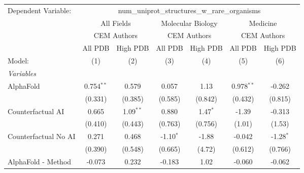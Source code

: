\begingroup
\centering
\begin{tabular}{lcccccc}
   \tabularnewline \midrule \midrule
   Dependent Variable: & \multicolumn{6}{c}{num\_uniprot\_structures\_w\_rare\_organisms}\\
 & \multicolumn{2}{c}{All Fields} & \multicolumn{2}{c}{Molecular Biology} & \multicolumn{2}{c}{Medicine} \\
\cmidrule(lr){2-3} \cmidrule(lr){4-5} \cmidrule(lr){6-7}
 & \multicolumn{2}{c}{CEM Authors} & \multicolumn{2}{c}{CEM Authors} & \multicolumn{2}{c}{CEM Authors} \\
\cmidrule(lr){2-3} \cmidrule(lr){4-5} \cmidrule(lr){6-7}
 & \multicolumn{1}{c}{All PDB} & \multicolumn{1}{c}{High PDB} & \multicolumn{1}{c}{All PDB} & \multicolumn{1}{c}{High PDB} & \multicolumn{1}{c}{All PDB} & \multicolumn{1}{c}{High PDB} \\
\cmidrule(lr){2-2} \cmidrule(lr){3-3} \cmidrule(lr){4-4} \cmidrule(lr){5-5} \cmidrule(lr){6-6} \cmidrule(lr){7-7}
   Model:                                                     & (1)          & (2)           & (3)           & (4)           & (5)          & (6)\\  
   \midrule
   \emph{Variables}\\
   AlphaFold                                                  & 0.754$^{**}$ & 0.579         & 0.057         & 1.13          & 0.978$^{**}$ & -0.262\\   
                                                              & (0.331)      & (0.385)       & (0.585)       & (0.842)       & (0.432)      & (0.815)\\   
   Counterfactual AI                                          & 0.665        & 1.09$^{**}$   & 0.880         & 1.47$^{*}$    & -1.39        & -0.313\\   
                                                              & (0.410)      & (0.443)       & (0.763)       & (0.756)       & (1.01)       & (1.53)\\   
   Counterfactual No AI                                       & 0.271        & 0.468         & -1.10$^{*}$   & -1.88         & -0.042       & -1.28$^{*}$\\   
                                                              & (0.390)      & (0.548)       & (0.665)       & (4.72)        & (0.612)      & (0.766)\\   
   AlphaFold - Method                                         & -0.073       & 0.232         & -0.183        & 1.02          & -0.060       & -0.062\\   

\end{tabular}
